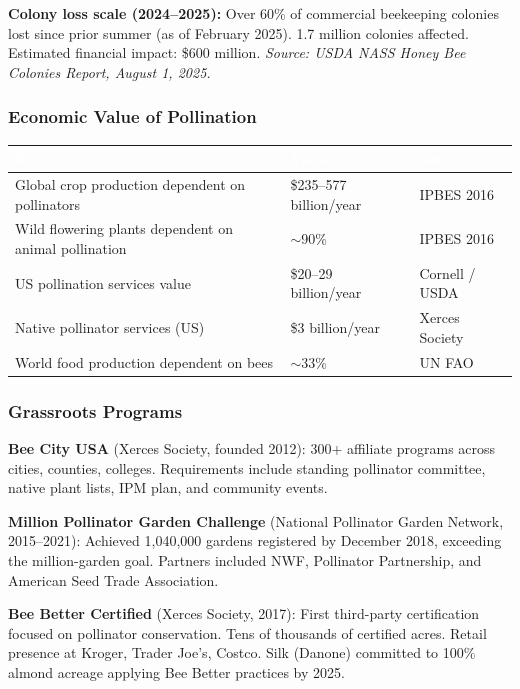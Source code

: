 \documentclass[11pt,letterpaper]{article}
\newcommand{\tableheader}[1]{\textbf{\sffamily\textcolor{white}{#1}}}
\begin{document}
\textbf{Colony loss scale (2024--2025):} Over 60\% of commercial beekeeping colonies lost since prior summer (as of February 2025). 1.7 million colonies affected. Estimated financial impact: \$600 million. \textit{Source: USDA NASS Honey Bee Colonies Report, August 1, 2025.}

\subsubsection{Economic Value of Pollination}

\begin{center}
\begin{tabularx}{\textwidth}{L{4.5cm}L{3cm}X}
\toprule
{}
\tableheader{Metric} & \tableheader{Value} & \tableheader{Source} \\
\midrule
Global crop production dependent on pollinators & \$235--577 billion/year & IPBES 2016 \\
Wild flowering plants dependent on animal pollination & $\sim$90\% & IPBES 2016 \\
US pollination services value & \$20--29 billion/year & Cornell / USDA \\
Native pollinator services (US) & \$3 billion/year & Xerces Society \\
World food production dependent on bees & $\sim$33\% & UN FAO \\
\bottomrule
\end{tabularx}
\end{center}

\subsubsection{Grassroots Programs}

\textbf{Bee City USA} (Xerces Society, founded 2012): 300+ affiliate programs across cities, counties, colleges. Requirements include standing pollinator committee, native plant lists, IPM plan, and community events.

\textbf{Million Pollinator Garden Challenge} (National Pollinator Garden Network, 2015--2021): Achieved 1,040,000 gardens registered by December 2018, exceeding the million-garden goal. Partners included NWF, Pollinator Partnership, and American Seed Trade Association.

\textbf{Bee Better Certified} (Xerces Society, 2017): First third-party certification focused on pollinator conservation. Tens of thousands of certified acres. Retail presence at Kroger, Trader Joe's, Costco. Silk (Danone) committed to 100\% almond acreage applying Bee Better practices by 2025.
\end{document}
